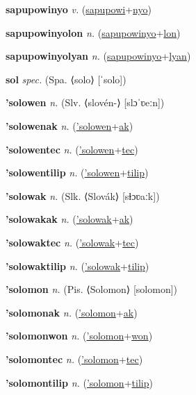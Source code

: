 \textbf{\hypertarget{sapupowinyo}{sapupowinyo}} \textit{v.} (\hyperlink{sapupowi}{sapupowi}+\allowbreak \hyperlink{nyo}{nyo})


\textbf{\hypertarget{sapupowinyolon}{sapupowinyolon}} \textit{n.} (\hyperlink{sapupowinyo}{sapupowinyo}+\allowbreak \hyperlink{lon}{lon})


\textbf{\hypertarget{sapupowinyolyan}{sapupowinyolyan}} \textit{n.} (\hyperlink{sapupowinyo}{sapupowinyo}+\allowbreak \hyperlink{lyan}{lyan})


\textbf{\hypertarget{sol}{sol}} \textit{spec.} (Spa. ⟨solo⟩ [ˈsolo])


\textbf{\hypertarget{'solowen}{'solowen}} \textit{n.} (Slv. ⟨slovén-⟩ [slɔˈʋeːn])


\textbf{\hypertarget{'solowenak}{'solowenak}} \textit{n.} (\hyperlink{'solowen}{'solowen}+\allowbreak \hyperlink{ak}{ak})


\textbf{\hypertarget{'solowentec}{'solowentec}} \textit{n.} (\hyperlink{'solowen}{'solowen}+\allowbreak \hyperlink{tec}{tec})


\textbf{\hypertarget{'solowentilip}{'solowentilip}} \textit{n.} (\hyperlink{'solowen}{'solowen}+\allowbreak \hyperlink{tilip}{tilip})


\textbf{\hypertarget{'solowak}{'solowak}} \textit{n.} (Slk. ⟨Slovák⟩ [sɫɔʋaːk])


\textbf{\hypertarget{'solowakak}{'solowakak}} \textit{n.} (\hyperlink{'solowak}{'solowak}+\allowbreak \hyperlink{ak}{ak})


\textbf{\hypertarget{'solowaktec}{'solowaktec}} \textit{n.} (\hyperlink{'solowak}{'solowak}+\allowbreak \hyperlink{tec}{tec})


\textbf{\hypertarget{'solowaktilip}{'solowaktilip}} \textit{n.} (\hyperlink{'solowak}{'solowak}+\allowbreak \hyperlink{tilip}{tilip})


\textbf{\hypertarget{'solomon}{'solomon}} \textit{n.} (Pis. ⟨Solomon⟩ [solomon])


\textbf{\hypertarget{'solomonak}{'solomonak}} \textit{n.} (\hyperlink{'solomon}{'solomon}+\allowbreak \hyperlink{ak}{ak})


\textbf{\hypertarget{'solomonwon}{'solomonwon}} \textit{n.} (\hyperlink{'solomon}{'solomon}+\allowbreak \hyperlink{won}{won})


\textbf{\hypertarget{'solomontec}{'solomontec}} \textit{n.} (\hyperlink{'solomon}{'solomon}+\allowbreak \hyperlink{tec}{tec})


\textbf{\hypertarget{'solomontilip}{'solomontilip}} \textit{n.} (\hyperlink{'solomon}{'solomon}+\allowbreak \hyperlink{tilip}{tilip})


